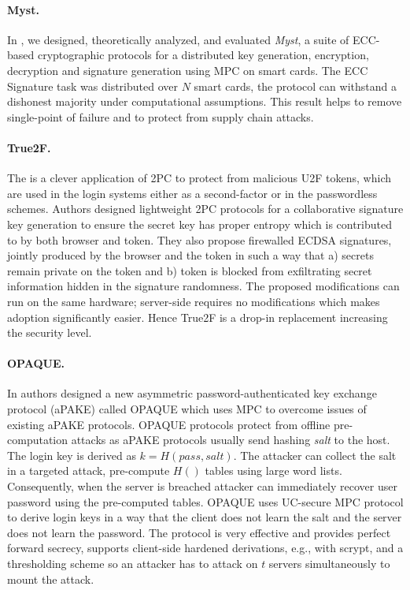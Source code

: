 \documentclass[
  digital, %
  twoside, %
  table,   %
  lof,     %
  lot,     %
]{fithesis3}
\theoremstyle{definition}
\theoremstyle{remark}
\begin{document}
\paragraph{Myst.} In \cite{2017-ccs-mavroudis}, we designed, theoretically analyzed, and evaluated \emph{Myst}, a suite of ECC-based cryptographic protocols for a distributed key generation, encryption, decryption and signature generation using MPC on smart cards.
The ECC Signature task was distributed over $N$ smart cards, the protocol can withstand a dishonest majority under computational assumptions. This result helps to remove single-point of failure and to protect from supply chain attacks.
    
\paragraph{True2F.} The \cite{DCMBR18} is a clever application of 2PC to protect from malicious U2F tokens, which are used in the login systems either as a second-factor or in the passwordless schemes. 
Authors designed lightweight 2PC protocols for a collaborative signature key generation to ensure the secret key has proper entropy which is contributed to by both browser and token. They also propose firewalled ECDSA signatures, jointly produced by the browser and the token in such a way that a) secrets remain private on the token and b) token is blocked from exfiltrating secret information hidden in the signature randomness.
The proposed modifications can run on the same hardware; server-side requires no modifications which makes adoption significantly easier. Hence True2F is a drop-in replacement increasing the security level.
    
\paragraph{OPAQUE.} In \cite{JKX18} authors designed a new asymmetric password-authenticated key exchange protocol (aPAKE) called OPAQUE which uses MPC to overcome issues of existing aPAKE protocols.
OPAQUE protocols protect from offline pre-computation attacks as aPAKE protocols usually send hashing \emph{salt} to the host. 
The login key is derived as $k=H(pass, salt)$. The attacker can collect the salt in a targeted attack, pre-compute $H()$ tables using large word lists. Consequently, when the server is breached attacker can immediately recover user password using the pre-computed tables. OPAQUE uses UC-secure MPC protocol to derive login keys in a way that the client does not learn the salt and the server does not learn the password. The protocol is very effective and provides perfect forward secrecy, supports client-side hardened derivations, e.g., with scrypt, and a thresholding scheme so an attacker has to attack on $t$ servers simultaneously to mount the attack.
\end{document}
